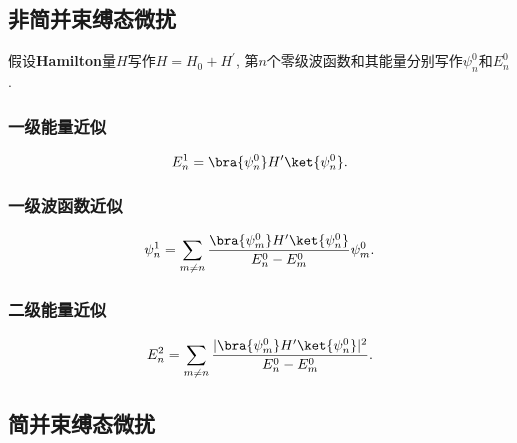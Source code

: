 \subsection{非简并束缚态微扰}
假设\textbf{Hamilton}量$H$写作$H=H_0+H^{\prime}$, 第$n$个零级波函数和其能量分别写作$\psi^{0}_n$和$E^{0}_n$.
\subsubsection{一级能量近似}
\begin{equation}
E^{1}_n=\bra{\psi^{0}_n}H^{\prime}\ket{\psi^{0}_n}.
\end{equation}
\subsubsection{一级波函数近似}
\begin{equation}
\psi^{1}_n=\sum_{m\ne n}^{} \frac{\bra{\psi^{0}_m}H^{\prime}\ket{\psi^{0}_n}}{E^{0}_n-E^{0}_m}\psi^{0}_m.
\end{equation}
\subsubsection{二级能量近似}
\begin{equation}
E^{2}_n=\sum_{m\ne n}^{} \frac{|\bra{\psi^{0}_m}H^{\prime}\ket{\psi^{0}_n}|^2}{E^{0}_n-E^{0}_m}.
\end{equation}
\subsection{简并束缚态微扰}
